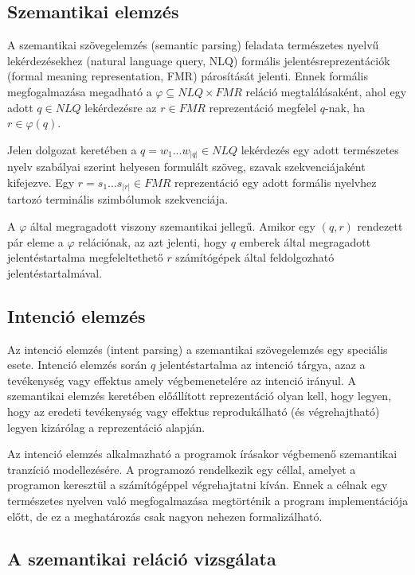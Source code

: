 \documentclass[twoside, 12pt]{report}
\begin{document}
\subsection{Szemantikai elemzés}

A szemantikai szövegelemzés (semantic parsing) feladata természetes nyelvű lekérdezésekhez (natural language query, NLQ) formális jelentésreprezentációk (formal meaning representation, FMR) párosítását jelenti. Ennek formális megfogalmazása megadható a $\varphi \subseteq NLQ \times FMR$ reláció megtalálásaként, ahol egy adott $q \in NLQ$ lekérdezésre az $r \in FMR$ reprezentáció megfelel $q$-nak, ha $r \in \varphi(q)$.

Jelen dolgozat keretében a $q = w_{1} ... w_{|q|} \in NLQ$ lekérdezés egy adott természetes nyelv szabályai szerint helyesen formulált szöveg, szavak szekvenciájaként kifejezve. Egy $r = s_{1} ... s_{|r|} \in FMR$ reprezentáció egy adott formális nyelvhez tartozó terminális szimbólumok szekvenciája.

A $\varphi$ által megragadott viszony szemantikai jellegű. Amikor egy $(q, r)$ rendezett pár eleme a $\varphi$ relációnak, az azt jelenti, hogy $q$ emberek által megragadott jelentéstartalma megfeleltethető $r$ számítógépek által feldolgozható jelentéstartalmával.

\subsection{Intenció elemzés}

Az intenció elemzés (intent parsing) a szemantikai szövegelemzés egy speciális esete. Intenció elemzés során $q$ jelentéstartalma az intenció tárgya, azaz a tevékenység vagy effektus amely végbemenetelére az intenció irányul. A szemantikai elemzés keretében előállított reprezentáció olyan kell, hogy legyen, hogy az eredeti tevékenység vagy effektus reprodukálható (és végrehajtható) legyen kizárólag a reprezentáció alapján.

Az intenció elemzés alkalmazható a programok írásakor végbemenő szemantikai tranzíció modellezésére. A programozó rendelkezik egy céllal, amelyet a programon keresztül a számítógéppel végrehajtatni kíván. Ennek a célnak egy természetes nyelven való megfogalmazása megtörténik a program implementációja előtt, de ez a meghatározás csak nagyon nehezen formalizálható.

\subsection{A szemantikai reláció vizsgálata}
\end{document}
